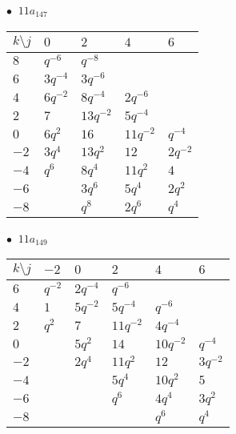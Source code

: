 \begin{minipage}{\linewidth}
$\bullet\ $ $11a_{147}$ \vspace{0.5em} \\
\begin{tabular}{l|llll}
$k \setminus j$ & $0$ & $2$ & $4$ & $6$ \\
\hline
$8$ & $q^{-6}$ & $q^{-8}$ &  &  \\
$6$ & $3q^{-4}$ & $3q^{-6}$ &  &  \\
$4$ & $6q^{-2}$ & $8q^{-4}$ & $2q^{-6}$ &  \\
$2$ & $7$ & $13q^{-2}$ & $5q^{-4}$ &  \\
$0$ & $6q^{2}$ & $16$ & $11q^{-2}$ & $q^{-4}$ \\
$-2$ & $3q^{4}$ & $13q^{2}$ & $12$ & $2q^{-2}$ \\
$-4$ & $q^{6}$ & $8q^{4}$ & $11q^{2}$ & $4$ \\
$-6$ &  & $3q^{6}$ & $5q^{4}$ & $2q^{2}$ \\
$-8$ &  & $q^{8}$ & $2q^{6}$ & $q^{4}$ \\
\end{tabular}
\vspace{2em}
\end{minipage}
%
\begin{minipage}{\linewidth}
$\bullet\ $ $11a_{149}$ \vspace{0.5em} \\
\begin{tabular}{l|lllll}
$k \setminus j$ & $-2$ & $0$ & $2$ & $4$ & $6$ \\
\hline
$6$ & $q^{-2}$ & $2q^{-4}$ & $q^{-6}$ &  &  \\
$4$ & $1$ & $5q^{-2}$ & $5q^{-4}$ & $q^{-6}$ &  \\
$2$ & $q^{2}$ & $7$ & $11q^{-2}$ & $4q^{-4}$ &  \\
$0$ &  & $5q^{2}$ & $14$ & $10q^{-2}$ & $q^{-4}$ \\
$-2$ &  & $2q^{4}$ & $11q^{2}$ & $12$ & $3q^{-2}$ \\
$-4$ &  &  & $5q^{4}$ & $10q^{2}$ & $5$ \\
$-6$ &  &  & $q^{6}$ & $4q^{4}$ & $3q^{2}$ \\
$-8$ &  &  &  & $q^{6}$ & $q^{4}$ \\
\end{tabular}
\vspace{2em}
\end{minipage}
%
